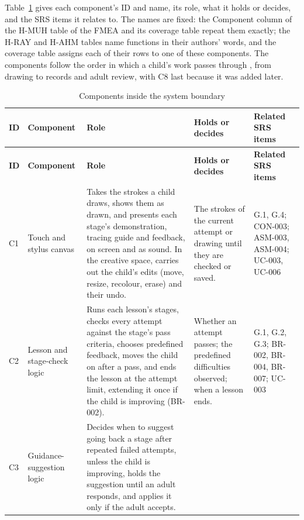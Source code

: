 \documentclass{article}
\begin{document}
Table~\ref{tab:components} gives each component's ID and name, its role, what it
holds or decides, and the SRS items it relates to. The names are fixed: the
Component column of the H-MUH table of the FMEA and its coverage table repeat
them exactly; the H-RAY and H-AHM tables name functions in their authors' words,
and the coverage table assigns each of their rows to one of these components.
The components follow the order in which a child's work passes through
\progname{}, from drawing to records and adult review, with C8 last because it
was added later.

{\footnotesize
\setlength{\tabcolsep}{4pt}
\begin{longtable}{@{}
  >{\raggedright\arraybackslash}p{}
  >{\raggedright\arraybackslash}p{}
  >{\raggedright\arraybackslash}p{}
  >{\raggedright\arraybackslash}p{}
  >{\raggedright\arraybackslash}p{}@{}} \caption{Components inside
  the system boundary}\label{tab:components}\\
\toprule
\textbf{ID} & \textbf{Component} & \textbf{Role} & \textbf{Holds or decides} &
\textbf{Related SRS items} \\
\midrule
\endfirsthead
\toprule
\textbf{ID} & \textbf{Component} & \textbf{Role} & \textbf{Holds or decides} &
\textbf{Related SRS items} \\
\midrule
\endhead
\bottomrule
\endlastfoot
C1 & Touch and stylus canvas & Takes the strokes a child draws, shows them as
drawn, and presents each stage's demonstration, tracing guide and feedback, on
screen and as sound. In the creative space, carries out the child's edits (move,
resize, recolour, erase) and their undo. & The strokes of the current attempt or
drawing until they are checked or saved. & G.1, G.4; CON-003; ASM-003, ASM-004;
UC-003, UC-006 \\
\addlinespace
C2 & Lesson and stage-check logic & Runs each lesson's stages, checks every
attempt against the stage's pass criteria, chooses predefined feedback, moves
the child on after a pass, and ends the lesson at the attempt limit, extending
it once if the child is improving (BR-002). & Whether an attempt passes; the
predefined difficulties observed; when a lesson ends. & G.1, G.2, G.3; BR-002,
BR-004, BR-007; UC-003 \\
\addlinespace
C3 & Guidance-suggestion logic & Decides when to suggest going back a stage
after repeated failed attempts, unless the child is improving, holds the
suggestion until an adult responds, and applies it only if the adult accepts. &

\end{longtable}}
\end{document}

